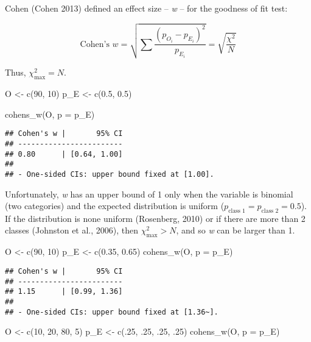 \documentclass[
]{article}
\newenvironment{Shaded}{\begin{snugshade}}{\end{snugshade}}
\newcommand{\AttributeTok}[1]{\textcolor[rgb]{0.77,0.63,0.00}{#1}}
\newcommand{\DecValTok}[1]{\textcolor[rgb]{0.00,0.00,0.81}{#1}}
\newcommand{\FloatTok}[1]{\textcolor[rgb]{0.00,0.00,0.81}{#1}}
\newcommand{\FunctionTok}[1]{\textcolor[rgb]{0.00,0.00,0.00}{#1}}
\newcommand{\NormalTok}[1]{#1}
\newcommand{\OtherTok}[1]{\textcolor[rgb]{0.56,0.35,0.01}{#1}}
\begin{document}
Cohen (Cohen 2013) defined an effect size -- \emph{w} -- for the
goodness of fit test:

\[
\text{Cohen's } w = \sqrt{\sum{\frac{(p_{O_i}-p_{E_i})^2}{p_{E_i}}}} = \sqrt{\frac{\chi^2}{N}}
\]

Thus, \(\chi^2_\text{max} = N\).

\begin{Shaded}
\begin{Highlighting}[]
\NormalTok{O }\OtherTok{\textless{}{-}} \FunctionTok{c}\NormalTok{(}\DecValTok{90}\NormalTok{, }\DecValTok{10}\NormalTok{)}
\NormalTok{p\_E }\OtherTok{\textless{}{-}} \FunctionTok{c}\NormalTok{(}\FloatTok{0.5}\NormalTok{, }\FloatTok{0.5}\NormalTok{)}

\FunctionTok{cohens\_w}\NormalTok{(O, }\AttributeTok{p =}\NormalTok{ p\_E)}
\end{Highlighting}
\end{Shaded}

\begin{verbatim}
## Cohen's w |       95% CI
## ------------------------
## 0.80      | [0.64, 1.00]
## 
## - One-sided CIs: upper bound fixed at [1.00].
\end{verbatim}

Unfortunately, \emph{w} has an upper bound of 1 only when the variable
is binomial (two categories) and the expected distribution is uniform
(\(p_{\text{class 1}} = p_{\text{class 2}} = 0.5\)). If the distribution
is none uniform (Rosenberg, 2010) or if there are more than 2 classes
(Johnston et al., 2006), then \(\chi^2_\text{max} > N\), and so \emph{w}
can be larger than 1.

\begin{Shaded}
\begin{Highlighting}[]
\NormalTok{O }\OtherTok{\textless{}{-}} \FunctionTok{c}\NormalTok{(}\DecValTok{90}\NormalTok{, }\DecValTok{10}\NormalTok{)}
\NormalTok{p\_E }\OtherTok{\textless{}{-}} \FunctionTok{c}\NormalTok{(}\FloatTok{0.35}\NormalTok{, }\FloatTok{0.65}\NormalTok{)}
\FunctionTok{cohens\_w}\NormalTok{(O, }\AttributeTok{p =}\NormalTok{ p\_E)}
\end{Highlighting}
\end{Shaded}

\begin{verbatim}
## Cohen's w |       95% CI
## ------------------------
## 1.15      | [0.99, 1.36]
## 
## - One-sided CIs: upper bound fixed at [1.36~].
\end{verbatim}

\begin{Shaded}
\begin{Highlighting}[]
\NormalTok{O }\OtherTok{\textless{}{-}} \FunctionTok{c}\NormalTok{(}\DecValTok{10}\NormalTok{, }\DecValTok{20}\NormalTok{, }\DecValTok{80}\NormalTok{, }\DecValTok{5}\NormalTok{)}
\NormalTok{p\_E }\OtherTok{\textless{}{-}} \FunctionTok{c}\NormalTok{(.}\DecValTok{25}\NormalTok{, .}\DecValTok{25}\NormalTok{, .}\DecValTok{25}\NormalTok{, .}\DecValTok{25}\NormalTok{)}
\FunctionTok{cohens\_w}\NormalTok{(O, }\AttributeTok{p =}\NormalTok{ p\_E)}
\end{Highlighting}
\end{Shaded}
\end{document}
